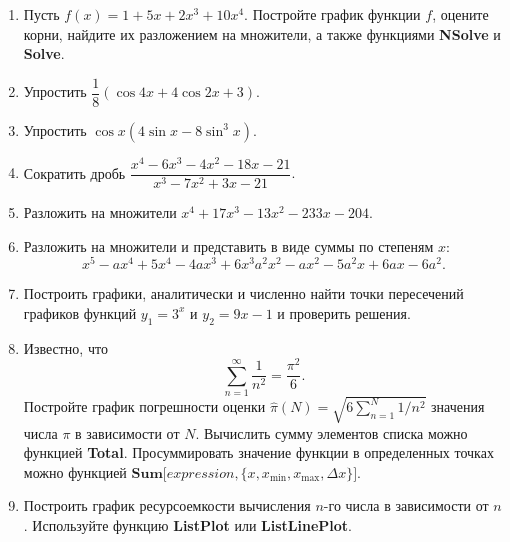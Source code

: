\documentclass[preview]{standalone}
\begin{document}
\begin{enumerate}
	\item Пусть $f(x)=1+5x + 2x^3 + 10x^4$. Постройте график функции $f$, оцените корни, найдите их разложением на множители, а также функциями \textbf{NSolve} и \textbf{Solve}. 
	\item Упростить $\dfrac{1}{8}(\cos4x + 4\cos2x + 3)$.
	\item Упростить $\cos x(4\sin x - 8\sin^3 x)$.
	\item Сократить дробь $\dfrac{x^4 - 6x^3 - 4x^2 - 18x - 21}{x^3 - 7x^2 +3x - 21}.$
	\item Разложить на множители $x^4 + 17x^3 - 13x^2 - 233x - 204$.
	\item Разложить на множители и представить в виде суммы по степеням $x$:
	\[
	x^5 - ax^4 + 5x^4 - 4ax^3 + 6x^3  a^2 x^2 - a x^2 - 5a^2 x + 6 a x - 6a^2.
	\]
	\item Построить графики, аналитически и численно найти точки пересечений графиков функций $y_1=3^x$ и $y_2=9x-1$  и проверить решения.
	\item Известно, что 
	\[
	\sum_{n=1}^{\infty} \dfrac{1}{n^2} = \dfrac{\pi^2}{6}.
	\]
	Постройте график погрешности оценки $\hat{\pi}(N)=\sqrt{6\sum_{n=1}^N 1/n^2}$ значения числа $\pi$ в зависимости от $N$. Вычислить сумму элементов списка можно функцией \textbf{Total}. Просуммировать значение функции в определенных точках можно функцией $ \textbf{Sum[}expression, \{x, x_{\min}, x_{\max}, \Delta x \}\textbf{]}$.  
	\item Построить график ресурсоемкости вычисления $n$-го числа в зависимости от $n$. Используйте функцию \textbf{ListPlot} или \textbf{ListLinePlot}. 
	
\end{enumerate}
\end{document}
